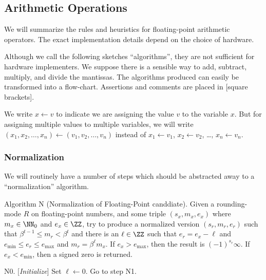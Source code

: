 
\subsection{Arithmetic Operations}

We will summarize the rules and heuristics for floating-point arithmetic
operators. The exact implementation details depend on the choice of
hardware.

\begin{danger}
  Although we call the following sketches ``algorithms'', they are not
  sufficient for hardware implementers. We suppose there is a sensible
  way to add, subtract, multiply, and divide the mantissas. The
  algorithms produced can easily be transformed into a
  flow-chart. Assertions and comments are placed in [square brackets].
\end{danger}

\begin{notation}
  We write $x\gets v$ to indicate we are assigning the value $v$ to the
  variable $x$. But for assigning multiple values to multiple variables,
  we will write $(x_{1}, x_{2}, \dots, x_{n})\gets(v_{1},v_{2},\dots,v_{n})$
  instead of $x_{1}\gets v_{1}$, $x_{2}\gets v_{2}$, \dots, $x_{n}\gets v_{n}$.
\end{notation}

\subsubsection{Normalization}

We will routinely have a number of steps which should be abstracted away
to a ``normalization'' algorithm.

\algbegin Algorithm N (Normalization of Floating-Point canddiate). Given
a rounding-mode $R$ on floating-point numbers, and
some triple $(s_{x}, m_{x}, e_{x})$ where $m_{x}\in\NN_{0}$ and
$e_{x}\in\ZZ$, try to produce a normalized version $(s_{r}, m_{r}, e_{r})$
such that $\beta^{t-1}\leq m_{r}<\beta^{t}$ and there is an $\ell\in\ZZ$
such that $e_{r}=e_{x}-\ell$ and $e_{\text{min}}\leq e_{r}\leq e_{\text{max}}$
and $m_{r} = \beta^{\ell}m_{x}$. If $e_{x}> e_{\text{max}}$, then the
result is $(-1)^{s_{r}}\infty$. If $e_{x} < e_{\text{min}}$, then a
signed zero is returned.

\algstep N0. [{\it Initialize\/}] Set $\ell\gets0$. Go to step N1.

